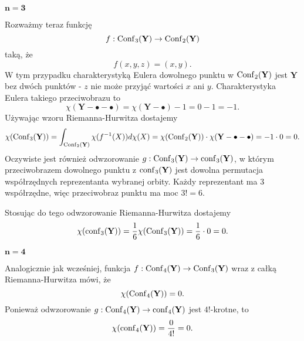 \bigskip

$\mathbf{n=3}$ \dotfill

Rozważmy teraz funkcję 
$$f:\operatorname{Conf}_3(\mathbf{Y})\to \operatorname{Conf}_2(\mathbf{Y})$$ 
taką, że 
$$f(x, y, z)=(x, y).$$
W tym przypadku charakterystyką Eulera dowolnego punktu w $\operatorname{Conf}_2(\mathbf{Y})$ jest $\mathbf{Y}$ bez dwóch punktów - $z$ nie może przyjąć wartości $x$ ani $y$. Charakterystyka Eulera takiego przeciwobrazu to 
$$\chi(\mathbf{Y}-\bullet-\bullet)=\chi(\mathbf{Y}-\bullet)-1=0-1=-1.$$
Używając wzoru Riemanna-Hurwitza dostajemy
$$\chi(\operatorname{Conf}_3(\mathbf{Y}))=\int_{\operatorname{Conf}_2(\mathbf{Y})}\chi(f^{-1}(X))d\chi(X)=\chi(\operatorname{Conf}_2(\mathbf{Y}))\cdot\chi(\mathbf{Y}-\bullet-\bullet)=-1\cdot0=0.$$
Oczywiste jest również odwzorowanie $g:\operatorname{Conf}_3(\mathbf{Y})\to \operatorname{conf}_3(\mathbf{Y})$, w którym przeciwobrazem dowolnego punktu z $\operatorname{conf}_3(\mathbf{Y})$ jest dowolna permutacja współrzędnych reprezentanta wybranej orbity. Każdy reprezentant ma $3$ współrzędne, więc przeciwobraz punktu ma moc $3!=6$.

Stosując do tego odwzorowanie Riemanna-Hurwitza dostajemy
$$\chi(\operatorname{conf}_3(\mathbf{Y}))=\frac{1}{6}\chi(\operatorname{Conf}_3(\mathbf{Y}))=\frac{1}{6}\cdot 0=0.$$
\bigskip

$\mathbf{n=4}$ \dotfill

Analogicznie jak wcześniej, funkcja $f:\operatorname{Conf}_4(\mathbf{Y})\to \operatorname{Conf}_3(\mathbf{Y})$ wraz z całką Riemanna-Hurwitza mówi, że
$$\chi(\operatorname{Conf}_4(\mathbf{Y}))=0.$$
Ponieważ odwzorowanie $g:\operatorname{Conf}_4(\mathbf{Y})\to \operatorname{conf}_4(\mathbf{Y})$ jest $4!$-krotne, to 
$$\chi(\operatorname{conf}_4(\mathbf{Y}))=\frac{0}{4!}=0.$$
